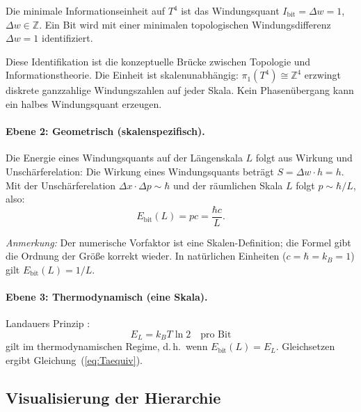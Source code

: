 \begin{definition}
Die minimale Informationseinheit auf \(T^4\) ist das Windungsquant
\(I_\text{bit} = \Delta w = 1\), \(\Delta w \in \mathbb{Z}\).
Ein Bit wird mit einer minimalen topologischen Windungsdifferenz
\(\Delta w = 1\) identifiziert.
\end{definition}

Diese Identifikation ist die konzeptuelle Brücke zwischen
Topologie und Informationstheorie.
Die Einheit ist skalenunabhängig: \(\pi_1(T^4) \cong \mathbb{Z}^4\)
erzwingt diskrete ganzzahlige Windungszahlen auf jeder Skala.
Kein Phasenübergang kann ein halbes Windungsquant erzeugen.

\paragraph{Ebene 2: Geometrisch (skalenspezifisch).}

Die Energie eines Windungsquants auf der Längenskala \(L\) folgt
aus Wirkung und Unschärferelation:
Die Wirkung eines Windungsquants beträgt \(S = \Delta w \cdot h = h\).
Mit der Unschärferelation \(\Delta x \cdot \Delta p \sim \hbar\)
und der räumlichen Skala \(L\) folgt \(p \sim \hbar/L\),
also:
\begin{equation}
  E_\text{bit}(L) = pc = \frac{\hbar c}{L}.
  \label{eq:Ebit}
\end{equation}

\textit{Anmerkung:} Der numerische Vorfaktor ist eine Skalen-Definition;
die Formel gibt die Ordnung der Größe korrekt wieder.
In natürlichen Einheiten (\(c = \hbar = k_B = 1\)) gilt \(E_\text{bit}(L) = 1/L\).

\paragraph{Ebene 3: Thermodynamisch (eine Skala).}

Landauers Prinzip \cite{Landauer1961}:
\begin{equation}
  E_L = k_B T \ln 2 \quad \text{pro Bit}
  \label{eq:Landauer}
\end{equation}
gilt im thermodynamischen Regime, d.\,h.\ wenn
\(E_\text{bit}(L) = E_L\).
Gleichsetzen ergibt Gleichung~(\ref{eq:Taequiv}).

\subsection{Visualisierung der Hierarchie}

